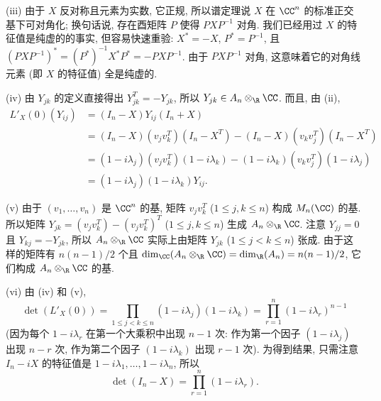 \begin{solution}
(iii) 由于 $X$ 反对称且元素为实数, 它正规, 所以谱定理说 $X$ 在 $\CC^n$ 的标准正交基下可对角化; 换句话说, 存在酉矩阵 $P$ 使得 $PXP^{-1}$ 对角. 我们已经用过 $X$ 的特征值是纯虚的的事实, 但容易快速重验: $X^* = -X$, $P^* = P^{-1}$, 且 $(PXP^{-1})^* = (P^*)^{-1}X^*P^* = -PXP^{-1}$. 由于 $PXP^{-1}$ 对角, 这意味着它的对角线元素 (即 $X$ 的特征值) 全是纯虚的.

(iv) 由 $Y_{jk}$ 的定义直接得出 $Y_{jk}^T = -Y_{jk}$, 所以 $Y_{jk} \in A_n \otimes_{\R}\CC$. 而且, 由 (ii),
\begin{align*}
L'_X(0)(Y_{ij}) &= (I_n - X)Y_{ij}(I_n + X) \\
&= (I_n - X)(v_jv_k^T)(I_n - X^T) - (I_n - X)(v_kv_j^T)(I_n - X^T) \\
&= (1 - i\lambda_j)(v_jv_k^T)(1 - i\lambda_k) - (1 - i\lambda_k)(v_kv_j^T)(1 - i\lambda_j) \\
&= (1 - i\lambda_j)(1 - i\lambda_k)Y_{ij}.
\end{align*}

(v) 由于 $(v_1, \ldots, v_n)$ 是 $\CC^n$ 的基, 矩阵 $v_jv_k^T$ ($1 \leq j, k \leq n$) 构成 $M_n(\CC)$ 的基. 所以矩阵 $Y_{jk} = (v_jv_k^T) - (v_jv_k^T)^T$ ($1 \leq j, k \leq n$) 生成 $A_n \otimes_{\R}\CC$. 注意 $Y_{jj} = 0$ 且 $Y_{kj} = -Y_{jk}$, 所以 $A_n \otimes_{\R}\CC$ 实际上由矩阵 $Y_{jk}$ ($1 \leq j < k \leq n$) 张成. 由于这样的矩阵有 $n(n-1)/2$ 个且 $\dim_{\CC}(A_n \otimes_{\R}\CC) = \dim_{\R}(A_n) = n(n-1)/2$, 它们构成 $A_n \otimes_{\R}\CC$ 的基.

(vi) 由 (iv) 和 (v),
\[
\det(L'_X(0)) = \prod_{1 \leq j < k \leq n}(1 - i\lambda_j)(1 - i\lambda_k) = \prod_{r=1}^n(1 - i\lambda_r)^{n-1}
\]
(因为每个 $1 - i\lambda_r$ 在第一个大乘积中出现 $n-1$ 次: 作为第一个因子 $(1 - i\lambda_j)$ 出现 $n - r$ 次, 作为第二个因子 $(1 - i\lambda_k)$ 出现 $r - 1$ 次). 为得到结果, 只需注意 $I_n - iX$ 的特征值是 $1 - i\lambda_1, \ldots, 1 - i\lambda_n$, 所以
\[
\det(I_n - X) = \prod_{r=1}^n(1 - i\lambda_r).
\]


\end{solution}
